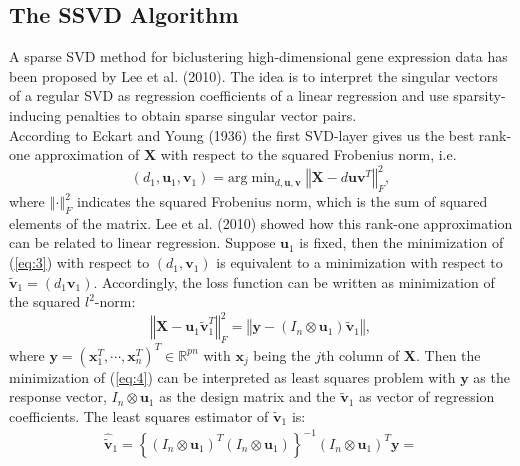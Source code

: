\documentclass{bioinfo}
\begin{document}
\begin{methods}
\subsection{The SSVD Algorithm}
A sparse SVD method for biclustering high-dimensional gene expression data has been proposed by Lee et al. (2010). The idea is to interpret the singular vectors of a regular SVD as regression coefficients of a linear regression and use sparsity-inducing penalties to obtain sparse singular vector pairs.\\
According to Eckart and Young (1936)\nocite{Eckart1936} the first SVD-layer gives us the best rank-one approximation of $\mathbf{X}$ with respect to the squared Frobenius norm, i.e. 
\begin{equation}
 (d_{1},\mathbf{u}_{1},\mathbf{v}_{1})=\text{arg} \mathop{\mbox{min}}_{d,\mathbf{u},\mathbf{v}} \left\Vert \mathbf{X} - d\mathbf{u}\mathbf{v}^{T} \right\Vert_{F}^{2},
\label{eq:3}
\end{equation}
where $\left\Vert \cdot \right\Vert_{F}^{2}$ indicates the squared Frobenius norm, which is the sum of squared elements of the matrix.
Lee et al. (2010) showed how this rank-one approximation can be related to linear regression. Suppose $\mathbf{u}_1$ is fixed, then the minimization of (\ref{eq:3}) with respect to $(d_{1},\mathbf{v}_{1})$ is equivalent to a minimization with respect to  $\mathbf{\tilde{v}}_{1}=(d_{1}\mathbf{v}_{1})$.
Accordingly, the loss function can be written as minimization of the squared $\textit{l}^{2}$-norm:
\begin{equation}\left\Vert \mathbf{X} - \mathbf{u}_{1}\mathbf{\tilde{v}}_{1}^{T}\right\Vert_{F}^{2}=
\left\Vert \mathbf{y}-(I_{n}\otimes\mathbf{u}_{1})\mathbf{\tilde{v}}_{1}\right\Vert,
\label{eq:4}
\end{equation}
where $\mathbf{y}=(\mathbf{x}_{1}^{T},\cdots,\mathbf{x}_{n}^{T})^T \in \mathbb{R}^{pn}$ with $\mathbf{x}_{j}$ being the $j$th column of $\mathbf{X}$. Then the minimization of (\ref{eq:4}) can be interpreted as least squares problem with $\mathbf{y}$ as the response vector, $I_{n}\otimes\mathbf{u}_{1}$ as the design matrix and the $\mathbf{\tilde{v}}_{1}$ as vector of regression coefficients. The least squares estimator of $\mathbf{\tilde{v}}_{1}$ is: 
\begin{equation}
\begin{split}
\mathbf{\hat{\tilde{v}}}_{1}=
\left\{(I_{n}\otimes\mathbf{u}_{1})^T(I_{n}\otimes\mathbf{u}_{1})\right\}^{-1}(I_{n}\otimes\mathbf{u}_{1})^T\mathbf{y}=\\

\end{split}
\end{equation}
\end{methods}
\end{document}
